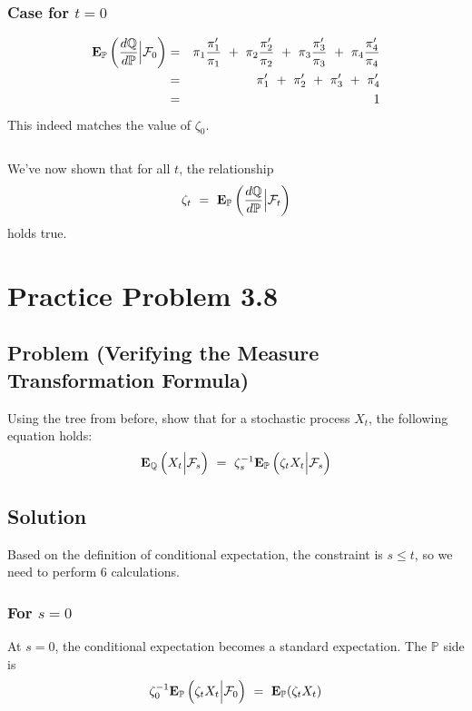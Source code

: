 \documentclass[uplatex,a4j,12pt,dvipdfmx]{jsarticle}
\begin{document}
\subsubsection{Case for $t=0$}

%
\begin{eqnarray*}
	{\bf E}_{\mathbb{P}}
	\left( \dfrac{ d \mathbb{Q} }{ d \mathbb{P} } \Big| \mathcal{F}_{0} \right)
	&=&
	\pi_{1} \dfrac{ \pi'_{1} }{ \pi_{1} }
	\ + \
	\pi_{2} \dfrac{ \pi'_{2} }{ \pi_{2} }
	\ + \
	\pi_{3} \dfrac{ \pi'_{3} }{ \pi_{3} }
	\ + \
	\pi_{4} \dfrac{ \pi'_{4} }{ \pi_{4} }
	\\ &=&
	\pi'_{1}
	\ + \
	\pi'_{2}
	\ + \
	\pi'_{3}
	\ + \
	\pi'_{4}
	\\ &=& 1
\end{eqnarray*}
%
This indeed matches the value of $\zeta_{0}$.

${}$

We've now shown that for all $t$, the relationship
$$
	\zeta_{t}
	\ = \
	{\bf E}_{\mathbb{P}}
	\left( \dfrac{ d \mathbb{Q} }{ d \mathbb{P} } \Big| \mathcal{F}_{t} \right)
$$
holds true.

\if0

	\section{Practice Problem 3.8}

	\subsection{Problem (Verifying the Measure Transformation Formula)}

	Using the tree from before, show that for a stochastic process $X_{t}$, the following equation holds:
	$$
		{\bf E}_{\mathbb{Q}}
		\left( X_{t} \Big| \mathcal{F}_{s} \right)
		\ = \
		\zeta_{s}^{-1}
		{\bf E}_{\mathbb{P}}
		\left( \zeta_{t} X_{t} \Big| \mathcal{F}_{s} \right)
	$$
	\subsection{Solution}

	Based on the definition of conditional expectation, the constraint is $s \leq t$, so we need to perform 6 calculations.

	\subsubsection{ For $s=0$ }

	At $s=0$, the conditional expectation becomes a standard expectation.
	The $\mathbb{P}$ side is
	\begin{eqnarray*}
		\zeta_{0}^{-1}
		{\bf E}_{\mathbb{P}}
		\left( \zeta_{t} X_{t} \Big| \mathcal{F}_{0} \right)
		\ = \
		{\bf E}_{\mathbb{P}}
		( \zeta_{t} X_{t} )
	\end{eqnarray*}
\end{document}
